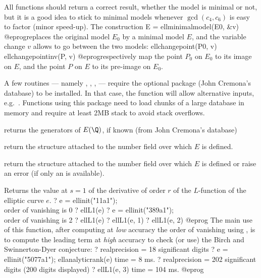 All functions should return a correct result, whether the model is minimal or
not, but it is a good idea to stick to minimal models whenever
$\gcd(c_4,c_6)$ is easy to factor (minor speed-up). The construction
\bprog
  E = ellminimalmodel(E0, &v)
@eprog\noindent replaces the original model $E_0$ by a minimal model $E$,
and the variable change $v$ allows to go between the two models:
\bprog
  ellchangepoint(P0, v)
  ellchangepointinv(P, v)
@eprog\noindent respectively map the point $P_0$ on $E_0$ to its image on
$E$, and the point $P$ on $E$ to its pre-image on $E_0$.

A few routines --- namely , ,
,  --- require the optional package 
(John Cremona's database) to be installed. In that case, the function
 will allow alternative inputs, e.g.~.
Functions using this package need to load chunks of a large database in
memory and require at least 2MB stack to avoid stack overflows.

\item {} returns the generators of $E(\Q)$, if known (from John
  Cremona's database)


\item {} return the  structure attached to the number field
over which $E$ is defined.

\item {} return the  structure attached to the number field
over which $E$ is defined or raise an error (if only an  is available).


\label{se:ellL1}
Returns the value at $s=1$ of the derivative of order $r$ of the
$L$-function of the elliptic curve $e$.
\bprog
? e = ellinit("11a1"); \\ order of vanishing is 0
? ellL1(e)
? e = ellinit("389a1");  \\ order of vanishing is 2
? ellL1(e)
? ellL1(e, 1)
? ellL1(e, 2)
@eprog\noindent
The main use of this function, after computing at \emph{low} accuracy the
order of vanishing using , is to compute the
leading term at \emph{high} accuracy to check (or use) the Birch and
Swinnerton-Dyer conjecture:
\bprog
? 
  realprecision = 18 significant digits
? e = ellinit("5077a1"); ellanalyticrank(e)
time = 8 ms.
? 
  realprecision = 202 significant digits (200 digits displayed)
? ellL1(e, 3)
time = 104 ms.
@eprog

